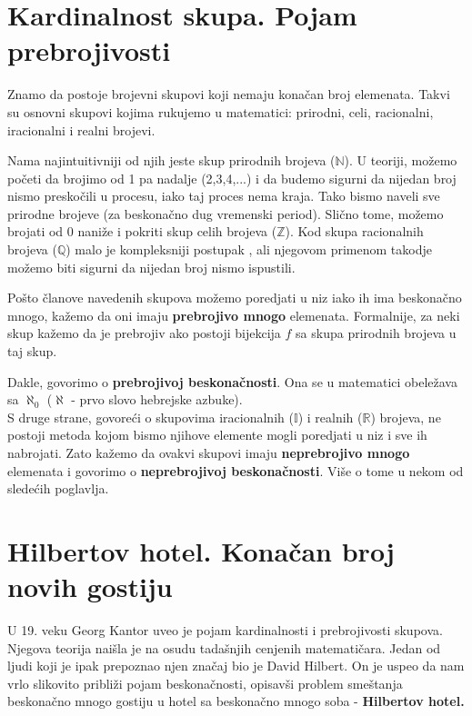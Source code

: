 \documentclass[a4paper]{article}
\begin{document}
\newpage

\section{Kardinalnost skupa. Pojam prebrojivosti}
\label{poglavlje:Kardinalnost. Pojam prebrojivosti}

Znamo da postoje brojevni skupovi koji nemaju konačan broj elemenata. Takvi su osnovni skupovi kojima rukujemo u matematici: prirodni, celi, racionalni, iracionalni i realni brojevi.

Nama najintuitivniji od njih jeste skup prirodnih brojeva ($\mathbb{N}$). U teoriji, možemo početi da brojimo od 1 pa nadalje (2,3,4,...) i da budemo sigurni da nijedan broj nismo preskočili u procesu, iako taj proces nema kraja. Tako bismo naveli sve prirodne brojeve (za beskonačno dug vremenski period). Slično tome, možemo brojati od 0 naniže i pokriti skup celih brojeva ($\mathbb{Z}$). Kod skupa racionalnih brojeva ($\mathbb{Q}$) malo je kompleksniji postupak \cite{Kantorov dijagonalni postupak}, ali njegovom primenom takodje možemo biti sigurni da nijedan broj nismo ispustili.

Pošto članove navedenih skupova možemo poredjati u niz iako ih ima beskonačno mnogo, kažemo da oni imaju \textbf{prebrojivo mnogo} elemenata. Formalnije, za neki skup kažemo da je prebrojiv ako postoji bijekcija $f$ sa skupa prirodnih brojeva u taj skup\cite{klaric2016}.

Dakle, govorimo o \textbf{prebrojivoj beskonačnosti}. Ona se u matematici obeležava sa $\aleph_{0}$ ($\aleph$ - prvo slovo hebrejske azbuke).\\

S druge strane, govoreći o skupovima iracionalnih ($\mathbb{I}$) i realnih ($\mathbb{R}$) brojeva, ne postoji metoda kojom bismo njihove elemente mogli poredjati u niz i sve ih nabrojati. Zato kažemo da ovakvi skupovi imaju \textbf{neprebrojivo mnogo} elemenata i govorimo o \textbf{neprebrojivoj beskonačnosti}. Više o tome u nekom od sledećih poglavlja.


\newpage

\section{Hilbertov hotel. Konačan broj novih gostiju}
\label{poglavlje:Hilbertov hotel. Konačan broj novih gostiju}
U 19. veku Georg Kantor uveo je pojam kardinalnosti i prebrojivosti skupova. Njegova teorija naišla je na osudu tadašnjih cenjenih matematičara.
Jedan od ljudi koji je ipak prepoznao njen značaj bio je David Hilbert\cite{David Hilbert}.
On je uspeo da nam vrlo slikovito približi pojam beskonačnosti, opisavši problem smeštanja beskonačno mnogo gostiju u hotel sa beskonačno mnogo soba - \textbf{Hilbertov hotel.}
\end{document}
